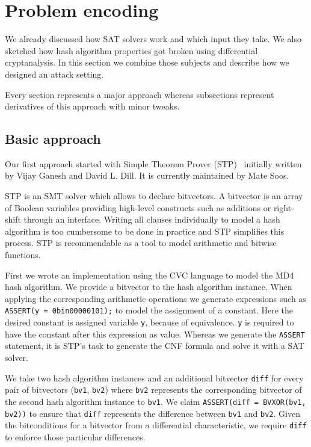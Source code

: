 \renewcommand*\chappic{img/encoding.pdf}
\renewcommand*\chapquote{There is concensus that encoding techniques usually have a dramatic impact on the efficiency of the SAT solver}
\renewcommand*\chapquotesrc{Magnus Bj\"ork}
\chapter{Problem encoding}
\label{ch:enc}

We already discussed how SAT solvers work and which input they take.
We also sketched how hash algorithm properties got broken using
differential cryptanalysis. In this section we combine those
subjects and describe how we designed an attack setting.

Every section represents a major approach whereas subsections
represent derivatives of this approach with minor tweaks.

\section{Basic approach}
\label{sec:enc-stp}
%
Our first approach started with Simple Theorem Prover (STP)~\cite{stp}
initially written by Vijay Ganesh and David L. Dill.
It is currently maintained by Mate Soos.

STP is an SMT solver which allows to declare bitvectors. A bitvector is an array of
Boolean variables providing high-level constructs such as additions or right-shift
through an interface. Writing all clauses individually to model a hash algorithm
is too cumbersome to be done in practice and STP simplifies this process.
STP is recommendable as a tool to model arithmetic and bitwise functions.

First we wrote an implementation using the CVC language to model the MD4 hash algorithm.
We provide a bitvector to the hash algorithm instance. When applying the corresponding
arithmetic operations we generate expressions such as \texttt{ASSERT(y = 0bin00000101);}
to model the assignment of a constant. Here the desired constant is assigned variable
\texttt{y}, because of equivalence. \texttt{y} is required to have the constant
after this expression as value. Whereas we generate the \texttt{ASSERT} statement,
it is STP's task to generate the CNF formula and solve it with a SAT solver.

We take two hash algorithm instances and an additional bitvector \texttt{diff}
for every pair of bitvectors (\texttt{bv1}, \texttt{bv2}) where \texttt{bv2} represents
the corresponding bitvector of the second hash algorithm instance to \texttt{bv1}.
We claim \texttt{ASSERT(diff = BVXOR(bv1, bv2))} to ensure that \texttt{diff}
represents the difference between \texttt{bv1} and \texttt{bv2}. Given the bitconditions
for a bitvector from a differential characteristic, we require \texttt{diff} to enforce
those particular differences.

